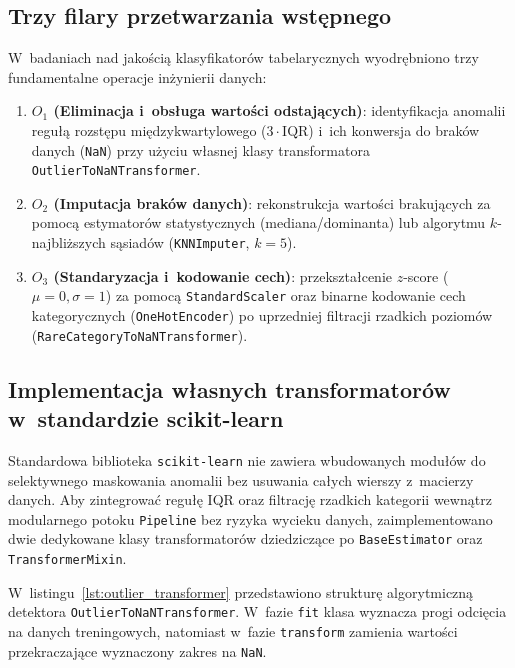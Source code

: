 \subsection{Trzy filary przetwarzania wstępnego}
W~badaniach nad jakością klasyfikatorów tabelarycznych wyodrębniono trzy fundamentalne operacje inżynierii danych:
\begin{enumerate}
    \item \textbf{$O_1$ (Eliminacja i~obsługa wartości odstających)}: identyfikacja anomalii regułą rozstępu międzykwartylowego ($3 \cdot \mathrm{IQR}$) i~ich konwersja do braków danych (\texttt{NaN}) przy użyciu własnej klasy transformatora \texttt{OutlierToNaNTransformer}.
    \item \textbf{$O_2$ (Imputacja braków danych)}: rekonstrukcja wartości brakujących za pomocą estymatorów statystycznych (mediana/dominanta) lub algorytmu $k$-najbliższych sąsiadów (\texttt{KNNImputer}, $k=5$).
    \item \textbf{$O_3$ (Standaryzacja i~kodowanie cech)}: przekształcenie $z$-score ($\mu=0, \sigma=1$) za pomocą \texttt{StandardScaler} oraz binarne kodowanie cech kategorycznych (\texttt{OneHotEncoder}) po uprzedniej filtracji rzadkich poziomów (\texttt{RareCategoryToNaNTransformer}).
\end{enumerate}

\subsection{Implementacja własnych transformatorów w~standardzie scikit-learn}
Standardowa biblioteka \texttt{scikit-learn} nie zawiera wbudowanych modułów do selektywnego maskowania anomalii bez usuwania całych wierszy z~macierzy danych. Aby zintegrować regułę IQR oraz filtrację rzadkich kategorii wewnątrz modularnego potoku \texttt{Pipeline} bez ryzyka wycieku danych, zaimplementowano dwie dedykowane klasy transformatorów dziedziczące po \texttt{BaseEstimator} oraz \texttt{TransformerMixin}.

W~listingu~\ref{lst:outlier_transformer} przedstawiono strukturę algorytmiczną detektora \texttt{OutlierToNaNTransformer}. W~fazie \texttt{fit} klasa wyznacza progi odcięcia na danych treningowych, natomiast w~fazie \texttt{transform} zamienia wartości przekraczające wyznaczony zakres na \texttt{NaN}.

